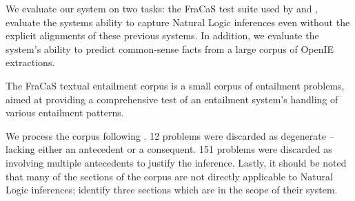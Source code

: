 We evaluate our system on two tasks: the FraCaS test suite used
  by  and ,
  evaluate the systems ability to capture Natural Logic inferences
  even without the explicit alignments of these previous systems.
In addition, we evaluate the system's ability to predict common-sense
  facts from a large corpus of OpenIE extractions.

%
%
The FraCaS textual entailment corpus \cite{key:1996cooper-fracas}
  is a small corpus of entailment problems, aimed at providing a
  comprehensive test of an entailment system's handling of various
  entailment patterns.

We process the corpus following .
12 problems were discarded as degenerate -- lacking either an antecedent or
  a consequent.
151 problems were discarded as involving multiple antecedents to
  justify the inference.
Lastly, it should be noted that many of the sections of the corpus
  are not directly applicable to Natural Logic inferences;
   identify three sections which
  are in the scope of their system.

